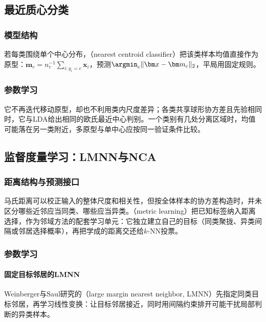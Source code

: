 \subsection{最近质心分类}
\label{sec:classification-nearest-centroid}

\subsubsection{模型结构}
若每类围绕单个中心分布，（nearest centroid classifier）把该类样本均值直接作为原型：$\bm m_c=n_c^{-1}\sum_{i:y_i=c}\bm x_i$，预测$\argmin_c\|\bm x-\bm m_c\|_2$，平局用固定规则。

\subsubsection{参数学习}
它不再迭代移动原型，却也不利用类内尺度差异；各类共享球形协方差且先验相同时，它与LDA给出相同的欧氏最近中心判别。一个类别有几处分离区域时，均值可能落在另一类附近，多原型与单中心应按同一验证条件比较。

\subsection{监督度量学习：LMNN与NCA}
\label{sec:classification-metric-learning}

\subsubsection{距离结构与预测接口}
马氏距离可以校正输入的整体尺度和相关性，但按全体样本的协方差构造时，并未区分哪些近邻应当同类、哪些应当异类。（metric learning）把已知标签纳入距离选择，作为邻域方法的配套学习单元：它独立建立自己的目标（同类聚拢、异类间隔或邻居选择概率），再把学成的距离交还给$k$-NN投票。

\subsubsection{参数学习}

\paragraph{固定目标邻居的LMNN}
Weinberger与Saul研究的（large margin nearest neighbor, LMNN）先指定同类目标邻居，再学习线性变换：让目标邻居接近，同时用间隔约束排开可能干扰局部判断的异类样本。

